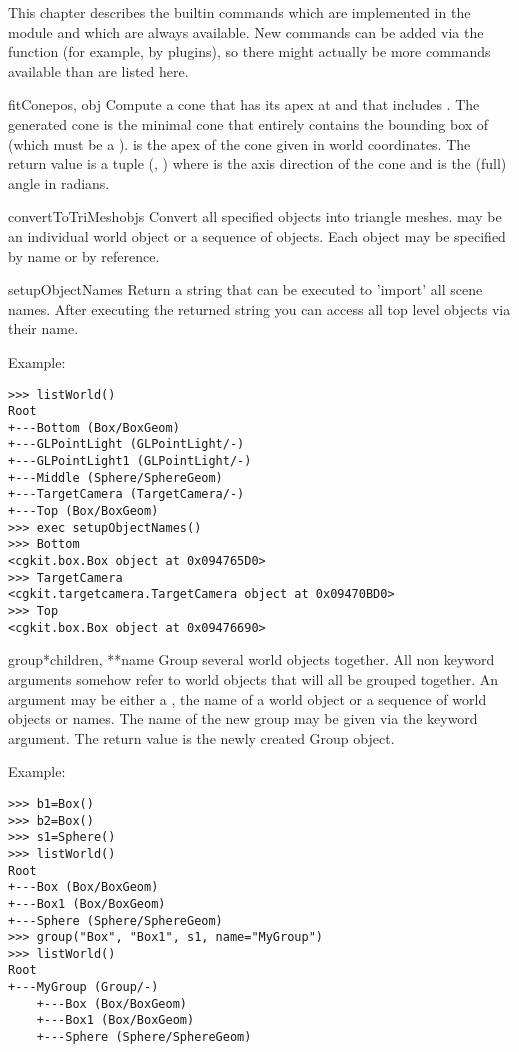 
This chapter describes the builtin commands which are implemented in
the  module and which are always available. New
commands can be added via the  function (for
example, by plugins), so there might actually be more commands
available than are listed here.

\begin{funcdesc}{fitCone}{pos, obj}
Compute a cone that has its apex at  and that includes
. The generated cone is the minimal cone that entirely
contains the bounding box of  (which must be a
).  is the apex of the cone given in world
coordinates. 
The return value is a tuple (, ) where  is the 
axis direction of the cone and  is the (full) angle in radians.
\end{funcdesc}

\begin{funcdesc}{convertToTriMesh}{objs}
Convert all specified objects into triangle meshes.  may be an
individual world object or a sequence of objects. Each object may be
specified by name or by reference.
\end{funcdesc}

\begin{funcdesc}{setupObjectNames}{}
Return a string that can be executed to 'import' all scene names.
After executing the returned string you can access all top level
objects via their name.

Example:

\begin{verbatim}
>>> listWorld()
Root
+---Bottom (Box/BoxGeom)
+---GLPointLight (GLPointLight/-)
+---GLPointLight1 (GLPointLight/-)
+---Middle (Sphere/SphereGeom)
+---TargetCamera (TargetCamera/-)
+---Top (Box/BoxGeom)
>>> exec setupObjectNames()
>>> Bottom
<cgkit.box.Box object at 0x094765D0>
>>> TargetCamera
<cgkit.targetcamera.TargetCamera object at 0x09470BD0>
>>> Top
<cgkit.box.Box object at 0x09476690>
\end{verbatim}
\end{funcdesc}

\begin{funcdesc}{group}{*children, **name}
Group several world objects together. All non keyword arguments
somehow refer to world objects that will all be grouped together. An
argument may be either a , the name of a world
object or a sequence of world objects or names. The name of the new group 
may be given via the  keyword argument.
The return value is the newly created Group object.

Example:

\begin{verbatim}
>>> b1=Box()
>>> b2=Box()
>>> s1=Sphere()
>>> listWorld()
Root
+---Box (Box/BoxGeom)
+---Box1 (Box/BoxGeom)
+---Sphere (Sphere/SphereGeom)
>>> group("Box", "Box1", s1, name="MyGroup")
>>> listWorld()
Root
+---MyGroup (Group/-)
    +---Box (Box/BoxGeom)
    +---Box1 (Box/BoxGeom)
    +---Sphere (Sphere/SphereGeom)
\end{verbatim}
\end{funcdesc}

